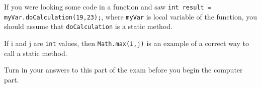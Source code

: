 \documentclass[12pt,twoside]{article}
\newcommand{\fillInBlank}[1][0.5in]{\underline{\hspace{#1}}}
\newcommand{\code}[1]{\texttt{#1}}
\begin{document}
\fillInBlank If you were looking some code in a function and saw \code{int result = myVar.doCalculation(19,23);}, where \code{myVar} is local variable of the function, you should assume that \code{doCalculation} is a static method.

\fillInBlank If i and j are \code{int} values, then \code{Math.max(i,j)} is an example of a correct way to call a static method.



\vfill
\vfill

\begin{center}
{\Large Turn in your answers to this part of the exam before you begin the computer part.}
\end{center}
\end{document}

